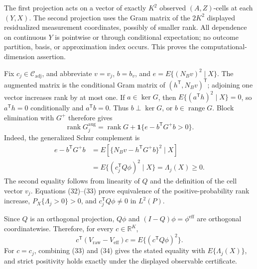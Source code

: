 The first projection acts on a vector of exactly \(K^2\) observed \((A,Z)\)-cells at each \((Y,X)\).  The second projection uses the Gram matrix of the \(2K^2\) displayed residualized measurement coordinates, possibly of smaller rank.  All dependence on continuous \(Y\) is pointwise or through conditional expectation; no outcome partition, basis, or approximation index occurs.  This proves the computational-dimension assertion.

Fix \(c_j\in\mathcal C_{\mathrm{adj}}\), and abbreviate \(v=v_j\), \(b=b_v\), and \(e=E\{(N_Bv)^2\mid X\}\).  The augmented matrix is the conditional Gram matrix of \((h^{\mathsf T},N_Bv)^{\mathsf T}\); adjoining one vector increases rank by at most one.  If \(a\in\ker G\), then \(E\{(a^{\mathsf T}h)^2\mid X\}=0\), so \(a^{\mathsf T}h=0\) conditionally and \(a^{\mathsf T}b=0\).  Thus \(b\perp\ker G\), or \(b\in\operatorname{range}G\).  Block elimination with \(G^+\) therefore gives
\[
\operatorname{rank}G_j^{\mathrm{aug}}
=\operatorname{rank}G+\mathbf 1\{e-b^{\mathsf T}G^+b>0\}. \tag{32}
\]
Indeed, the generalized Schur complement is
\[
\begin{aligned}
e-b^{\mathsf T}G^+b
&=E\!\left[\{N_Bv-h^{\mathsf T}G^+b\}^2\mid X\right]\\
&=E\{(c_j^{\mathsf T}Q\phi)^2\mid X\}
=\Lambda_j(X)\geq0.
\end{aligned} \tag{33}
\]
The second equality follows from linearity of \(Q\) and the definition of the cell vector \(v_j\).  Equations (32)--(33) prove equivalence of the positive-probability rank increase, \(P_X\{\Lambda_j>0\}>0\), and \(c_j^{\mathsf T}Q\phi\ne0\) in \(L^2(P)\).

Since \(Q\) is an orthogonal projection, \(Q\phi\) and \((I-Q)\phi=\phi^{\mathrm{eff}}\) are orthogonal coordinatewise.  Therefore, for every \(c\in\mathbb R^K\),
\[
c^{\mathsf T}(V_{\mathrm{raw}}-V_{\mathrm{eff}})c
=E\{(c^{\mathsf T}Q\phi)^2\}. \tag{34}
\]
For \(c=c_j\), combining (33) and (34) gives the stated equality with \(E\{\Lambda_j(X)\}\), and strict positivity holds exactly under the displayed observable certificate.

